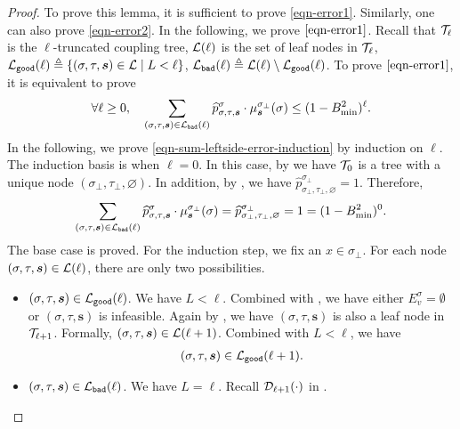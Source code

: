 \documentclass[11pt]{article}
\newcommand{\set}[1]{\left\{#1\right\}}
\renewcommand{\mid}{\;\middle\vert\;} \newcommand{\cmid}{\,:\,}
\def\!#1{\mathtt{#1}}
\newcommand{\seqS}{\boldsymbol{s}}
\begin{document}
\begin{proof}
To prove this lemma, it is sufficient to prove \eqref{eqn-error1}.
Similarly, one can also prove \eqref{eqn-error2}.
In the following, we prove $\eqref{eqn-error1}$.
Recall that $\mathcal{T}_{\ell}$ is the $\ell$-truncated coupling tree, $\mathcal{L}(\ell)$ is the set of leaf nodes in $\mathcal{T}_{\ell}$, 
$\+L_{\!{good}}(\ell)\triangleq \set{(\sigma,\tau, \seqS) \in \+L\mid L<\ell}$, $\+L_{\!{bad}}(\ell)\triangleq \+L(\ell)\setminus \+L_{\!{good}}(\ell)$.
To prove $\eqref{eqn-error1}$,
it is equivalent to prove
\begin{align}\label{eqn-sum-leftside-error-induction}
    \forall \ell\geq 0, \quad \sum_{(\sigma,\tau, \seqS)\in \+L_{\!{bad}}(\ell)} \widehat{p}^{\sigma}_{\sigma,\tau,\seqS} \cdot \mu^{\sigma_{\bot}}_{\seqS}(\sigma)\leq (1 - B_{\min}^2)^{\ell}.
\end{align}
In the following, we prove \eqref{eqn-sum-leftside-error-induction} by induction on $\ell$.
The induction basis is when $\ell = 0$.
In this case, by  we have $\mathcal{T}_{0}$ is a tree with a unique node $(\sigma_\bot, \tau_\bot, \varnothing)$.
In addition, by , we have 
$\widehat{p}^{\sigma_\bot}_{\sigma_\bot,\tau_\bot, \varnothing} = 1$.
Therefore, 
 \begin{align*}
    \sum_{(\sigma,\tau, \seqS)\in \+L_{\!{bad}}(\ell)} \widehat{p}^{\sigma}_{\sigma,\tau,\seqS}\cdot\mu^{\sigma_{\bot}}_{\seqS}(\sigma)=\widehat{p}^{\sigma_\bot}_{\sigma_\bot,\tau_\bot, \varnothing} = 1 = (1- B_{\min}^2)^{0}.
\end{align*}
The base case is proved. For the induction step, we fix an $x\in \sigma_\bot$. For each node $(\sigma,\tau,\seqS)\in \+L(\ell)$, 
there are only two possibilities.
\begin{itemize}
\item $(\sigma,\tau,\seqS) \in \+L_{\!{good}}(\ell)$. We have $L<\ell$.
Combined with ,
we have either $E_v^{\sigma}=\emptyset$ or $(\sigma, \tau, \seqS)$ is infeasible.
Again by ,
we have $(\sigma, \tau, \seqS)$ is also a leaf node in $\mathcal{T}_{\ell+1}$.
Formally, $(\sigma,\tau,\seqS)\in \+L(\ell+1)$.
Combined with $L<\ell$, 
we have 
\begin{align}\label{eq-lgoogl-subset}
(\sigma, \tau, \seqS)\in \+L_{\!{good}}(\ell+1).
\end{align}
\item $(\sigma,\tau,\seqS) \in \+L_{\!{bad}}(\ell)$. We have $L=\ell$.
Recall $\mathcal{D}_{\ell+1}(\cdot)$  in .

\end{itemize}
\end{proof}
\end{document}
